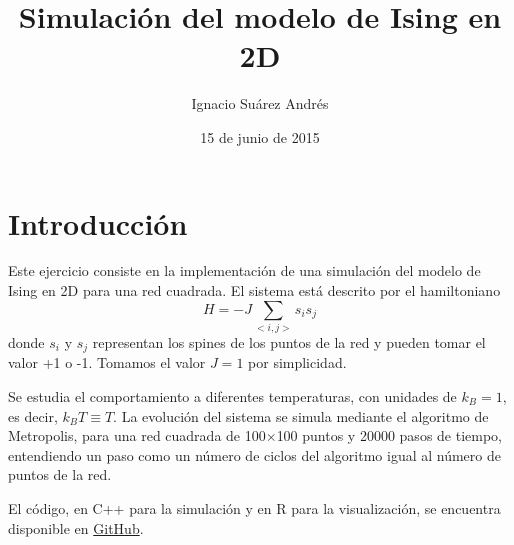 \documentclass{scrartcl}
\title{Simulación del modelo de Ising en 2D}
\author{Ignacio Suárez Andrés}
\date{15 de junio de 2015}
\begin{document}
\maketitle
\section{Introducción}
Este ejercicio consiste en la implementación de una simulación del modelo de Ising en 2D para una red cuadrada. El sistema está descrito por el hamiltoniano
\begin{equation}
H=-J\sum_{<i,j>} s_i s_j
\end{equation}
donde $s_i$ y $s_j$ representan los spines de los puntos de la red y pueden tomar el valor +1 o -1. Tomamos el valor $J=1$ por simplicidad.\par
Se estudia el comportamiento a diferentes temperaturas, con unidades de $k_B=1$, es decir, $k_BT\equiv T$. La evolución del sistema se simula mediante el algoritmo de Metropolis, para una red cuadrada de 100$\times$100 puntos y 20000 pasos de tiempo, entendiendo un paso como un número de ciclos del algoritmo igual al número de puntos de la red.\par
El código, en C++ para la simulación y en R para la visualización, se encuentra disponible en \href{https://github.com/nachosandres/Ising2D}{GitHub}.
\end{document}
